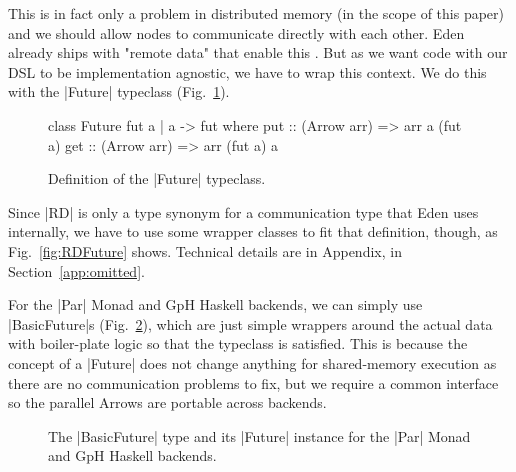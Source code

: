 This is in fact only a problem in distributed memory (in the scope of this paper) and we should  allow nodes to communicate directly with each other. Eden already ships with "remote data" that enable this \cite{AlGo03a,Dieterle2010}.
But as we want code with our DSL to be implementation agnostic, we have to wrap this context. We do this with the |Future| typeclass (Fig.~\ref{fig:future}).
\begin{figure}[h]
\begin{code}
class Future fut a | a -> fut where
    put :: (Arrow arr) => arr a (fut a)
    get :: (Arrow arr) => arr (fut a) a
\end{code}
\caption{Definition of the |Future| typeclass.}
\label{fig:future}
\end{figure}
Since |RD| is only a type synonym for a communication type that Eden uses internally, we have to use some wrapper classes to fit that definition, though, as Fig.~\ref{fig:RDFuture} shows. %
Technical details are in Appendix, in Section~\ref{app:omitted}.

For the |Par| Monad and GpH Haskell backends, we can simply use |BasicFuture|s (Fig.~\ref{fig:BasicFuture}), which are just simple wrappers around the actual data with boiler-plate logic so that the typeclass is satisfied. This is because the concept of a |Future| does not change anything for shared-memory execution as there are no communication problems to fix, but we require a common interface so the parallel Arrows are portable across backends.
\begin{figure}[tb]
\caption{The |BasicFuture| type and its |Future| instance for the |Par| Monad and GpH Haskell backends.}
\label{fig:BasicFuture}
\end{figure} %


